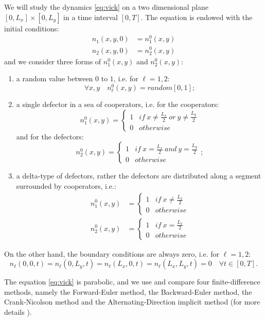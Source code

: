 We will study the dynamics \ref{eq:vick} on a two dimensional plane
$\left[0,L_{x}\right]\times\left[0,L_{y}\right]$ in a time interval
$\left[0,T\right]$. The equation is endowed with the initial conditions:
\begin{align*}
n_{1}\left(x,y,0\right) & =n_{1}^{0}\left(x,y\right)\\
n_{2}\left(x,y,0\right) & =n_{2}^{0}\left(x,y\right)
\end{align*}
and we consider three forms of $n_{1}^{0}\left(x,y\right)$ and $n_{2}^{0}\left(x,y\right)$:
\begin{enumerate}
\item a random value between $0$ to $1$, i.e. for $\ell=1,2$:
\[
\forall x,y\quad n_{\ell}^{0}\left(x,y\right)=random\left[0,1\right];
\]
\item a single defector in a sea of cooperators, i.e. for the cooperators:
\[
n_{1}^{0}\left(x,y\right)=\begin{cases}
1 & if\ x\neq\frac{L_{x}}{2}\ or\ y\neq\frac{L_{y}}{2}\\
0 & otherwise
\end{cases}
\]
 and for the defectors:
\[
n_{2}^{0}\left(x,y\right)=\begin{cases}
1 & if\ x=\frac{L_{x}}{2}\ and\ y=\frac{L_{y}}{2}\\
0 & otherwise
\end{cases};
\]
\item a delta-type of defectors, rather the defectors are distributed along
a segment surrounded by cooperators, i.e.:
\begin{align*}
n_{1}^{0}\left(x,y\right) & =\begin{cases}
1 & if\ x\neq\frac{L_{x}}{2}\\
0 & otherwise
\end{cases}\\
n_{2}^{0}\left(x,y\right) & =\begin{cases}
1 & if\ x=\frac{L_{x}}{2}\\
0 & otherwise
\end{cases}
\end{align*}
\end{enumerate}
On the other hand, the boundary conditions are always zero, i.e. for
$\ell=1,2$:
\[
n_{\ell}\left(0,0,t\right)=n_{\ell}\left(0,L_{y},t\right)=n_{\ell}\left(L_{x},0,t\right)=n_{\ell}\left(L_{x},L_{y},t\right)=0\quad\forall t\in\left[0,T\right].
\]

The equation \ref{eq:vick} is parabolic, and we use and compare four
finite-difference methods, namely the Forward-Euler method, the Backward-Euler
method, the Crank-Nicolson method and the Alternating-Direction implicit
method (for more details \cite{ames_numerical_1992,press_numerical_2007,pang_introduction_2006,thomas1995numerical,thomas1999numerical}).

